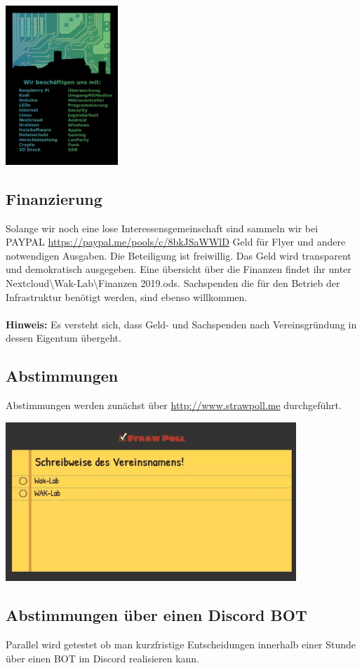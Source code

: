 \begin{minipage}[t]{0.5\textwidth}
  \centering
  \includegraphics[height=6cm]{pictures/FlyerRueckseite.jpg}
  \label{img:FlyerRueckseite}
\end{minipage}

\subsection{Finanzierung}
Solange wir noch eine lose Interessensgemeinschaft sind sammeln wir bei PAYPAL \url{https://paypal.me/pools/c/8bkJSaWWlD} Geld für Flyer und andere notwendigen Ausgaben. Die Beteiligung ist freiwillig. Das Geld wird transparent und demokratisch ausgegeben. Eine übersicht über die Finanzen findet ihr unter Nextcloud\textbackslash Wak-Lab\textbackslash Finanzen 2019.ods. Sachspenden die für den Betrieb der Infrastruktur benötigt werden, sind ebenso willkommen. \\
\ \\
\textbf{Hinweis:} Es versteht sich, dass Geld- und Sachspenden nach Vereinsgründung in dessen Eigentum übergeht.\\

\subsection{Abstimmungen}
Abstimmungen werden zunächst über \url{http://www.strawpoll.me} durchgeführt.\\

\begin{minipage}[t]{\textwidth}
  \centering
  \includegraphics[height=6cm]{pictures/StrawPoll.png}
  \label{img:StrawPoll}
\end{minipage}
\subsection{Abstimmungen über einen Discord BOT}
Parallel wird getestet ob man kurzfristige Entscheidungen innerhalb einer Stunde über einen BOT im Discord realisieren kann.

\newpage

 
